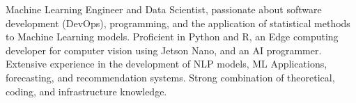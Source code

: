 

\begin{cvparagraph}

Machine Learning Engineer and Data Scientist, passionate about software development (DevOps), programming, and the application of statistical methods to Machine Learning models. Proficient in Python and R, an Edge computing developer for computer vision using Jetson Nano, and an AI programmer. Extensive experience in the development of NLP models, ML Applications, forecasting, and recommendation systems. Strong combination of theoretical, coding, and infrastructure knowledge.

\end{cvparagraph}
